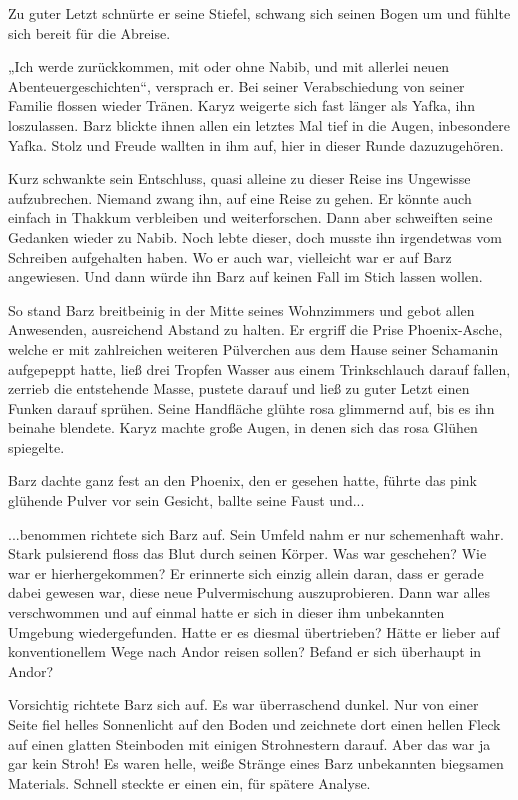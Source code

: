 Zu guter Letzt schnürte er seine Stiefel, schwang sich seinen Bogen um und fühlte sich bereit für die Abreise.

„Ich werde zurückkommen, mit oder ohne Nabib, und mit allerlei neuen Abenteuergeschichten“, versprach er. Bei seiner Verabschiedung von seiner Familie flossen wieder Tränen. Karyz weigerte sich fast länger als Yafka, ihn loszulassen. Barz blickte ihnen allen ein letztes Mal tief in die Augen, inbesondere Yafka. Stolz und Freude wallten in ihm auf, hier in dieser Runde dazuzugehören.

Kurz schwankte sein Entschluss, quasi alleine zu dieser Reise ins Ungewisse aufzubrechen. Niemand zwang ihn, auf eine Reise zu gehen. Er könnte auch einfach in Thakkum verbleiben und weiterforschen. Dann aber schweiften seine Gedanken wieder zu Nabib. Noch lebte dieser, doch musste ihn irgendetwas vom Schreiben aufgehalten haben. Wo er auch war, vielleicht war er auf Barz angewiesen. Und dann würde ihn Barz auf keinen Fall im Stich lassen wollen.

So stand Barz breitbeinig in der Mitte seines Wohnzimmers und gebot allen Anwesenden, ausreichend Abstand zu halten. Er ergriff die Prise Phoenix-Asche, welche er mit zahlreichen weiteren Pülverchen aus dem Hause seiner Schamanin aufgepeppt hatte, ließ drei Tropfen Wasser aus einem Trinkschlauch darauf fallen, zerrieb die entstehende Masse, pustete darauf und ließ zu guter Letzt einen Funken darauf sprühen. Seine Handfläche glühte rosa glimmernd auf, bis es ihn beinahe blendete. Karyz machte große Augen, in denen sich das rosa Glühen spiegelte.

Barz dachte ganz fest an den Phoenix, den er gesehen hatte, führte das pink glühende Pulver vor sein Gesicht, ballte seine Faust und...



\trennzeichen



...benommen richtete sich Barz auf. Sein Umfeld nahm er nur schemenhaft wahr. Stark pulsierend floss das Blut durch seinen Körper. Was war geschehen? Wie war er hierhergekommen? Er erinnerte sich einzig allein daran, dass er gerade dabei gewesen war, diese neue Pulvermischung auszuprobieren. Dann war alles verschwommen und auf einmal hatte er sich in dieser ihm unbekannten Umgebung wiedergefunden. Hatte er es diesmal übertrieben? Hätte er lieber auf konventionellem Wege nach Andor reisen sollen? Befand er sich überhaupt in Andor?

Vorsichtig richtete Barz sich auf. Es war überraschend dunkel. Nur von einer Seite fiel helles Sonnenlicht auf den Boden und zeichnete dort einen hellen Fleck auf einen glatten Steinboden mit einigen Strohnestern darauf. Aber das war ja gar kein Stroh! Es waren helle, weiße Stränge eines Barz unbekannten biegsamen Materials. Schnell steckte er einen ein, für spätere Analyse.

